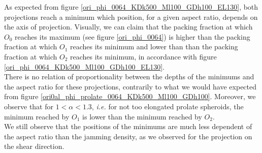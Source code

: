 \documentclass[class=report, float=false, crop=false]{standalone}
\begin{document}
As expected from figure \ref{ori_phi_0064_KDk500_Ml100_GDh100_EL130}, both projections reach a minimum which position, for a given aspect ratio, depends on the axis of projection. Visually, we can claim that the packing fraction at which $O_0$ reaches its maximum (see figure \ref{ori_phi_0064}) is higher than the packing fraction at which $O_1$ reaches its minimum and lower than than the packing fraction at which $O_2$ reaches its minimum, in accordance with figure \ref{ori_phi_0064_KDk500_Ml100_GDh100_EL130}.\\

There is no relation of proportionality between the depths of the minimums and the aspect ratio for these projections, contrarily to what we would have expected from figure \ref{ori0al_phi_prolate_0064_KDk500_Ml100_GDh100}. Moreover, we observe that for $1<\alpha<1.3$, \textit{i.e.} for not too elongated prolate spheroids, the minimum reached by $O_1$ is lower than the minimum reached by $O_2$.\\

We still observe that the positions of the minimums are much less dependent of the aspect ratio than the jamming density, as we observed for the projection on the shear direction.

\end{document}
